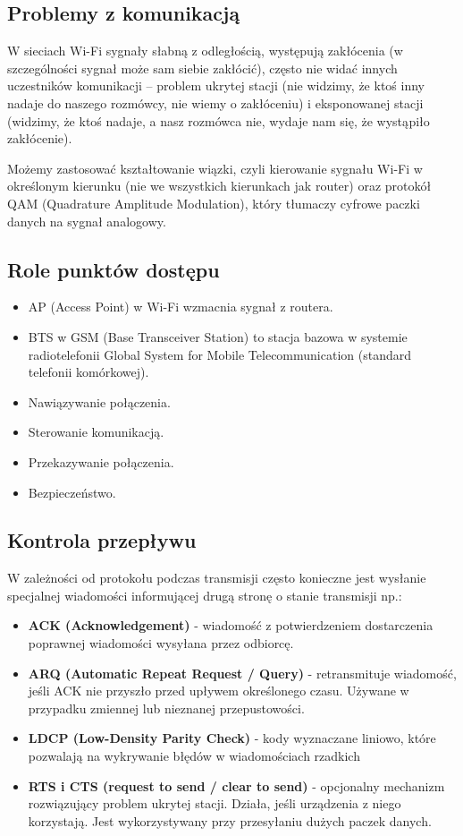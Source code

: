 \subsection{Problemy z komunikacją}
W sieciach Wi-Fi sygnały słabną z odległością, występują zakłócenia (w szczególności sygnał może sam siebie zakłócić), często nie widać innych uczestników komunikacji -- problem ukrytej stacji (nie widzimy, że ktoś inny nadaje do naszego rozmówcy, nie wiemy o zakłóceniu) i eksponowanej stacji (widzimy, że ktoś nadaje, a nasz rozmówca nie, wydaje nam się, że wystąpiło zakłócenie).

Możemy zastosować kształtowanie wiązki, czyli kierowanie sygnału Wi-Fi w określonym kierunku (nie we wszystkich kierunkach jak router) oraz protokół QAM (Quadrature Amplitude Modulation), który tłumaczy cyfrowe paczki danych na sygnał analogowy.

\subsection{Role punktów dostępu}
\begin{itemize}
	\item AP (Access Point) w Wi-Fi wzmacnia sygnał z routera.
	\item BTS w GSM (Base Transceiver Station) to stacja bazowa w systemie radiotelefonii Global System for Mobile Telecommunication (standard telefonii komórkowej).
	\item Nawiązywanie połączenia.
	\item Sterowanie komunikacją.
	\item Przekazywanie połączenia.
	\item Bezpieczeństwo.
\end{itemize}

\subsection{Kontrola przepływu}
W zależności od protokołu podczas transmisji często konieczne jest wysłanie specjalnej wiadomości informującej drugą stronę o stanie transmisji np.:
\begin{itemize}
	\item \textbf{ACK (Acknowledgement)} - wiadomość z potwierdzeniem dostarczenia poprawnej wiadomości wysyłana przez odbiorcę.
	\item \textbf{ARQ (Automatic Repeat Request / Query)} - retransmituje wiadomość, jeśli ACK nie przyszło przed upływem określonego czasu. Używane w przypadku zmiennej lub nieznanej przepustowości.
	\item\textbf{LDCP (Low-Density Parity Check)} - kody wyznaczane liniowo, które pozwalają na wykrywanie błędów w wiadomościach rzadkich
	\item \textbf{RTS i CTS (request to send / clear to send)} - opcjonalny mechanizm rozwiązujący problem ukrytej stacji. Działa, jeśli urządzenia z niego korzystają. Jest wykorzystywany przy przesyłaniu dużych paczek danych.
\end{itemize}

